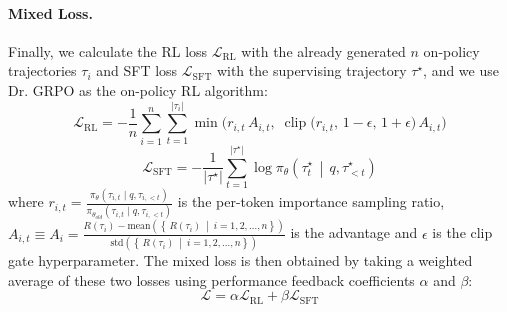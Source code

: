 \paragraph{Mixed Loss.} Finally, we calculate the RL loss $\mathcal{L}_{\mathrm{RL}}$ with the already generated $n$ on-policy trajectories $\tau_i$ and SFT loss $\mathcal{L}_{\mathrm{SFT}}$ with the supervising trajectory $\tau^\star$, and we use Dr. GRPO as the on-policy RL algorithm:
\begin{equation}
\label{eq: rl loss}
\mathcal{L}_{\mathrm{RL}}
=
-\frac{1}{n}\sum_{i=1}^{n}\sum_{t=1}^{|\tau_i|}
\min\!\Big(
r_{i,t}\,A_{i,t},\;
\operatorname{clip}\!\big(r_{i,t},\,1-\epsilon,\,1+\epsilon\big)\,A_{i,t}
\Big)
\end{equation}
\begin{equation}
\label{eq: sft loss}
\mathcal{L}_{\mathrm{SFT}}=
-\frac{1}{\lvert \tau^\star \rvert}
\sum_{t=1}^{\lvert \tau^\star \rvert}
\log \pi_\theta\!\left(\tau^\star_t \,\middle|\, q, \tau^\star_{<t}\right)
\end{equation}
where $r_{i,t}=\frac{\pi_{\theta}\left(\tau_{i,t}\mid q, \tau_{i,<t}\right)}{\pi_{\theta_{old}}\left(\tau_{i,t}\mid q, \tau_{i,<t}\right)}$ is the per-token importance sampling ratio, $A_{i,t}\equiv A_i =\frac{  R(\tau_i)-\mathrm{mean}\left(\left\{\, R(\tau_i)\ \middle|\ i=1,2,\ldots,n \right\}\right)}{\mathrm{std}\left(\left\{\, R(\tau_i)\ \middle|\  i=1,2,\ldots,n \right\}\right)}$ is the advantage  and $\epsilon$ is the clip gate hyperparameter.
The mixed loss is then obtained by taking a weighted average of these two losses using performance feedback coefficients $\alpha$ and $\beta$: 
\begin{equation}
\mathcal{L} = \alpha \mathcal{L}_{\mathrm{RL}} + \beta \mathcal{L}_{\mathrm{SFT}}
\end{equation}

